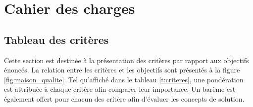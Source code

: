
%
%

\chapter{Cahier des charges}
\label{s:cahier_des_charges}

\section{Tableau des critères}
Cette section est destinée à la présentation des critères par rapport aux objectifs énoncés. La relation entre les critères et les objectifs sont présentés à la figure \ref{fig:maison_qualite}. Tel qu'affiché dans le tableau \ref{t:criteres}, une pondération est attribuée à chaque critère afin comparer leur importance. Un barème est également offert pour chacun des critère afin d'évaluer les concepts de solution.  

